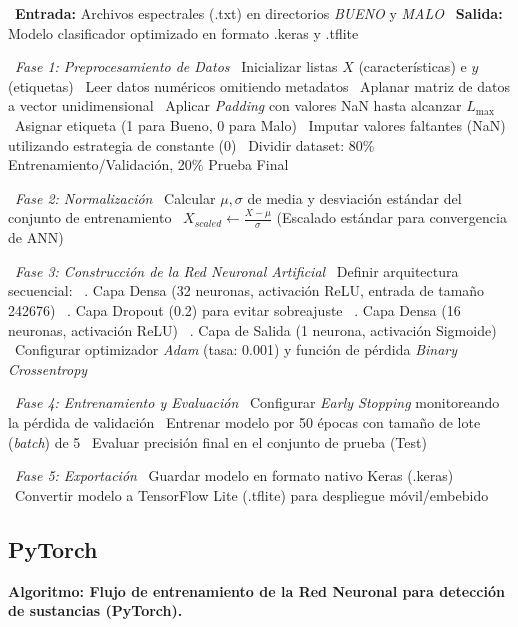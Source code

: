 \begin{algorithmic}[1]
\State~\textbf{Entrada:} Archivos espectrales (.txt) en directorios \textit{BUENO} y \textit{MALO}
\State~\textbf{Salida:} Modelo clasificador optimizado en formato \@.keras y \@.tflite

\State~\textit{Fase 1: Preprocesamiento de Datos}{}
\State~Inicializar listas $X$ (características) e $y$ (etiquetas)
%
    \State~Leer datos numéricos omitiendo metadatos
    \State~Aplanar matriz de datos a vector unidimensional
        \State~Aplicar \textit{Padding}{} con valores NaN hasta alcanzar $L_{\max}$%
    \EndIf%
    \State~Asignar etiqueta (1 para Bueno, 0 para Malo)
\EndFor%
\State~Imputar valores faltantes (NaN) utilizando estrategia de constante (0)
\State~Dividir dataset: 80\% Entrenamiento/Validación, 20\% Prueba Final

\State~\textit{Fase 2: Normalización}{}
\State~Calcular $\mu, \sigma$ de media y desviación estándar del conjunto de entrenamiento
\State~$X_{scaled} \leftarrow \frac{X - \mu}{\sigma}$ (Escalado estándar para convergencia de ANN)

\State~\textit{Fase 3: Construcción de la Red Neuronal Artificial}{}
\State~Definir arquitectura secuencial:
\State~. Capa Densa (32 neuronas, activación ReLU, entrada de tamaño 242676)
\State~. Capa Dropout (0.2) para evitar sobreajuste
\State~. Capa Densa (16 neuronas, activación ReLU)
\State~. Capa de Salida (1 neurona, activación Sigmoide)
\State~Configurar optimizador \textit{Adam}{} (tasa: 0.001) y función de pérdida \textit{Binary Crossentropy}{}

\State~\textit{Fase 4: Entrenamiento y Evaluación}{}
\State~Configurar \textit{Early Stopping}{} monitoreando la pérdida de validación
\State~Entrenar modelo por 50 épocas con tamaño de lote (\textit{batch}{}) de 5
\State~Evaluar precisión final en el conjunto de prueba (Test)

\State~\textit{Fase 5: Exportación}{}
\State~Guardar modelo en formato nativo Keras (.keras)
\State~Convertir modelo a TensorFlow Lite (.tflite) para despliegue móvil/embebido
\end{algorithmic}

\subsection{PyTorch}

\noindent\textbf{Algoritmo: Flujo de entrenamiento de la Red Neuronal para detección de sustancias (PyTorch).}

